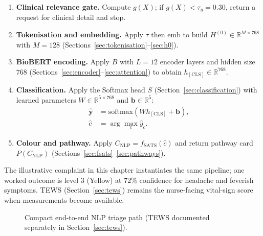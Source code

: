 \begin{enumerate}
\item \textbf{Clinical relevance gate.} Compute \(g(X)\); if \(g(X) < \tau_g=0.30\), return a request for clinical detail and stop.
\item \textbf{Tokenisation and embedding.} Apply \(\tau\) then \(\mathrm{emb}\) to build \(H^{(0)} \in \mathbb{R}^{M \times 768}\) with \(M=128\) (Sections~\ref{sec:tokenisation}--\ref{sec:h0}).
\item \textbf{BioBERT encoding.} Apply \(B\) with \(L=12\) encoder layers and hidden size \(768\) (Sections~\ref{sec:encoder}--\ref{sec:attention}) to obtain \(h_{\mathrm{[CLS]}}\in\mathbb{R}^{768}\).
\item \textbf{Classification.} Apply the Softmax head \(S\) (Section~\ref{sec:classification}) with learned parameters \(W\in\mathbb{R}^{5\times 768}\) and \(\mathbf{b}\in\mathbb{R}^{5}\):
\begin{align*}
  \hat{\mathbf{y}} &= \mathrm{softmax}(W h_{\mathrm{[CLS]}} + \mathbf{b}), \\
  \hat{c} &= \arg\max_c \hat{y}_c.
\end{align*}
\item \textbf{Colour and pathway.} Apply \(C_{\mathrm{NLP}} = f_{\mathrm{SATS}}(\hat{c})\) and return pathway card \(P(C_{\mathrm{NLP}})\) (Sections~\ref{sec:fsats}--\ref{sec:pathways}).
\end{enumerate}

The illustrative complaint in this chapter instantiates the same pipeline; one worked outcome is level 3 (Yellow) at 72\% confidence for headache and feverish symptoms. TEWS (Section~\ref{sec:tews}) remains the nurse-facing vital-sign score when measurements become available.

\begin{figure}[H]
\centering
{}
\caption{Compact end-to-end NLP triage path (TEWS documented separately in Section~\ref{sec:tews}).}
\label{fig:e2e}
\end{figure}

